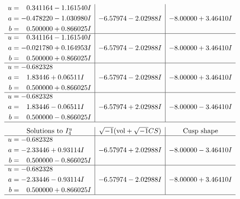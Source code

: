 \documentclass[1p]{elsarticle_modified}
\theoremstyle{definition}
\newcommand{\I}{\sqrt{-1}}
\begin{document}
$$\begin{array}{c|c|c}
\begin{aligned}
u &= \phantom{-}0.341164 - 1.161540 I \\
a &= -0.478220 - 1.030980 I \\
b &= \phantom{-}0.500000 + 0.866025 I\end{aligned}
 & -6.57974 - 2.02988 I & -8.00000 + 3.46410 I \\ \hline\begin{aligned}
u &= \phantom{-}0.341164 - 1.161540 I \\
a &= -0.021780 + 0.164953 I \\
b &= \phantom{-}0.500000 + 0.866025 I\end{aligned}
 & -6.57974 - 2.02988 I & -8.00000 + 3.46410 I \\ \hline\begin{aligned}
u &= -0.682328\phantom{ +0.000000I} \\
a &= \phantom{-}1.83446 + 0.06511 I \\
b &= \phantom{-}0.500000 + 0.866025 I\end{aligned}
 & -6.57974 - 2.02988 I & -8.00000 + 3.46410 I \\ \hline\begin{aligned}
u &= -0.682328\phantom{ +0.000000I} \\
a &= \phantom{-}1.83446 - 0.06511 I \\
b &= \phantom{-}0.500000 - 0.866025 I\end{aligned}
 & -6.57974 + 2.02988 I & -8.00000 - 3.46410 I\\
 \hline 
 \end{array}$$\newpage$$\begin{array}{c|c|c}  
\text{Solutions to }I^u_{4}& \I (\text{vol} + \sqrt{-1}CS) & \text{Cusp shape}\\
 \hline 
\begin{aligned}
u &= -0.682328\phantom{ +0.000000I} \\
a &= -2.33446 + 0.93114 I \\
b &= \phantom{-}0.500000 - 0.866025 I\end{aligned}
 & -6.57974 + 2.02988 I & -8.00000 - 3.46410 I \\ \hline\begin{aligned}
u &= -0.682328\phantom{ +0.000000I} \\
a &= -2.33446 - 0.93114 I \\
b &= \phantom{-}0.500000 + 0.866025 I\end{aligned}
 & -6.57974 - 2.02988 I & -8.00000 + 3.46410 I\\
 \hline 
 \end{array}$$\newpage
\end{document}
